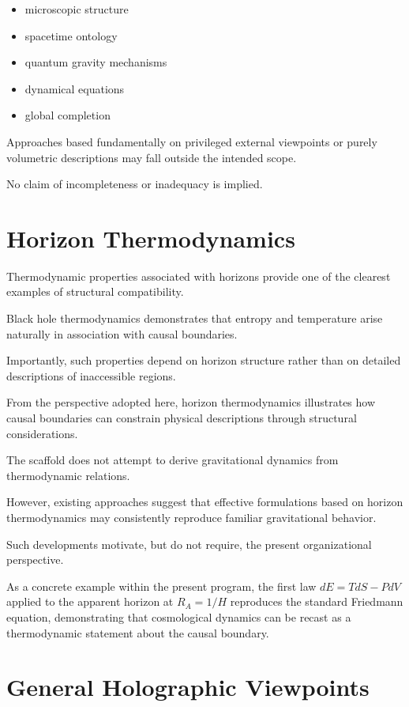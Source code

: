 \documentclass[12pt,a4paper]{article}
\begin{document}
\begin{itemize}
  \item microscopic structure
  \item spacetime ontology
  \item quantum gravity mechanisms
  \item dynamical equations
  \item global completion
\end{itemize}

Approaches based fundamentally on privileged external viewpoints or purely volumetric descriptions may fall outside the intended scope.

No claim of incompleteness or inadequacy is implied.

\section{Horizon Thermodynamics}

Thermodynamic properties associated with horizons provide one of the clearest examples of structural compatibility.

Black hole thermodynamics demonstrates that entropy and temperature arise naturally in association with causal boundaries.

Importantly, such properties depend on horizon structure rather than on detailed descriptions of inaccessible regions.

From the perspective adopted here, horizon thermodynamics illustrates how causal boundaries can constrain physical descriptions through structural considerations.

The scaffold does not attempt to derive gravitational dynamics from thermodynamic relations.

However, existing approaches suggest that effective formulations based on horizon thermodynamics may consistently reproduce familiar gravitational behavior.

Such developments motivate, but do not require, the present organizational perspective.

As a concrete example within the present program, the first law $dE = TdS - PdV$ applied to the apparent horizon at $R_A = 1/H$ reproduces the standard Friedmann equation, demonstrating that cosmological dynamics can be recast as a thermodynamic statement about the causal boundary.

\section{General Holographic Viewpoints}
\end{document}
